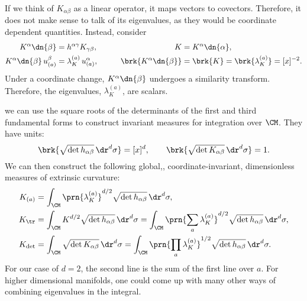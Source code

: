 \documentclass[12pt]{article}
\newcommand{\invsq}{^{-2}}
\begin{document}
If we think of $K_{\alpha\beta}$ as a linear operator, it maps vectors to covectors.
Therefore, it does not make sense to talk of its eigenvalues, as they would be coordinate dependent quantities.
Instead, consider
%
\begin{equation}\label{eq:curvop}
\begin{aligned}
  K^\alpha\dn{\beta} &= h^{\alpha\gamma}K_{\gamma\beta},  &
  K &= K^\alpha\dn{\alpha}, \\
  K^\alpha\dn{\beta} \, u^\beta_{(a)} &= \lambda^{(a)}_K \, u^\alpha_{(a)}, \qquad &
  \brk{K^\alpha\dn{\beta}} &= \brk{K} = \brk{\lambda^{(a)}_K} = [x]\invsq.
\end{aligned}
\end{equation}
%
Under a coordinate change, $K^\alpha\dn{\beta}$ undergoes a similarity transform.
Therefore, the eigenvalues, $\lambda^{(a)}_K$, are scalars.

we can use the square roots of the determinants of the first and third fundamental forms to construct invariant measures for integration over $\CM$.
They have units:
%
\begin{equation}\label{eq:measure units}
  \brk{\sqrt{\det h_{\alpha\beta}} \, \dr^d \sigma} = [x]^d,
  \qquad
  \brk{\sqrt{\det K_{\alpha\beta}} \, \dr^d \sigma} = 1.
\end{equation}
%
We can then construct the following global,, coordinate-invariant, dimensionless measures of extrinsic curvature:
%
\begin{equation}\label{eq:globalextr}
\begin{aligned}
  K_{(a)} &= \int_\CM \prn{\lambda^{(a)}_K}^{d/2} \sqrt{\det h_{\alpha\beta}} \, \dr^d \sigma, \\
  K_{\tr} &= \int_\CM K^{d/2} \sqrt{\det h_{\alpha\beta}} \, \dr^d \sigma
         = \int_\CM \prn{\sum_a \lambda^{(a)}_K}^{d/2} \sqrt{\det h_{\alpha\beta}} \, \dr^d \sigma, \\
  K_{\det} &= \int_\CM \sqrt{\det K_{\alpha\beta}} \, \dr^d \sigma
         = \int_\CM \prn{\prod_a \lambda^{(a)}_K}^{1/2} \sqrt{\det h_{\alpha\beta}} \, \dr^d \sigma. \\
\end{aligned}
\end{equation}
%
For our case of $d=2$, the second line is the sum of the first line over $a$.
For higher dimensional manifolds, one could come up with many other ways of combining eigenvalues in the integral.




\end{document}
